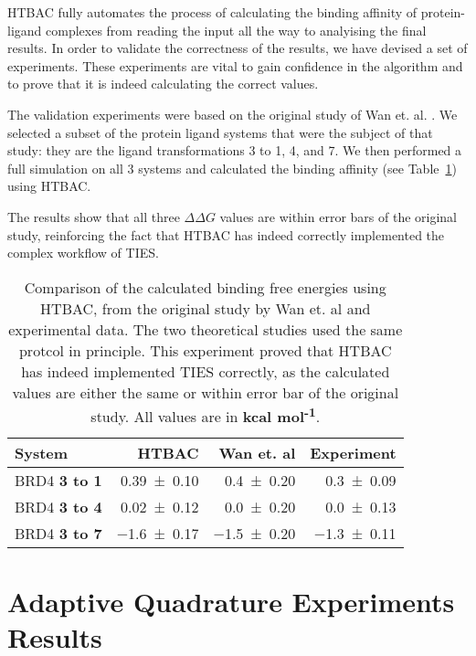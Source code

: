 HTBAC fully automates the process of calculating the binding affinity of
protein-ligand complexes from reading the input all the way to analyising the
final results. In order to validate the correctness of the results, we have
devised a set of experiments. These experiments are vital to gain confidence
in the algorithm and to prove that it is indeed calculating the correct values.

The validation experiments were based on the original study of Wan et. al.
\cite{Wan2017brd4}. We selected a subset of the protein ligand systems that
were the subject of that study: they are the ligand transformations 3 to 1, 4,
and 7. We then performed a full simulation on all 3 systems and calculated the
binding affinity (see Table~\ref{tab:exp2}) using HTBAC.

The results show that all three $\Delta \Delta G$ values are within error bars
of the original study, reinforcing the fact that HTBAC has indeed correctly
implemented the complex workflow of TIES.

\begin{table}
  \centering
  \begin{tabular}{l@{\hskip 1in}r@{\hskip 0.2in}r@{\hskip 0.2in}r}
    \toprule
    System & HTBAC & Wan et. al & Experiment \\
    \midrule
    BRD4 \textbf{3 to 1} & \num{0.39 +- 0.10} &   \num{0.4 +- 0.20} &  \num{0.3 +- 0.09} \\
    BRD4 \textbf{3 to 4} & \num{0.02 +- 0.12} &   \num{0.0 +- 0.20} &  \num{0.0 +- 0.13} \\
    BRD4 \textbf{3 to 7} & \num{-1.6 +- 0.17} &  \num{-1.5 +- 0.20} & \num{-1.3 +- 0.11} \\
    \bottomrule
  \end{tabular}

  \caption{Comparison of the calculated binding free energies using HTBAC, from
  the original study by Wan et. al and experimental data. The two theoretical
  studies used the same protcol in principle. This experiment proved that HTBAC
  has indeed implemented TIES correctly, as the calculated values are either
  the same or within error bar of the original study. All values are in
  \textbf{kcal mol\textsuperscript{-1}}.}
  \label{tab:exp2}


\end{table}


\section{Adaptive Quadrature Experiments Results}



